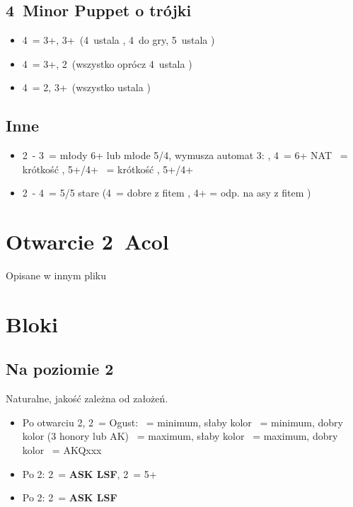 \documentclass[12pt, a4paper]{article}
\newcommand{\lsf}{\color{WildStrawberry}\textbf{ASK LSF}\color{black}}
\begin{document}
\subsection*{4\diams\ Minor Puppet o trójki}
\begin{itemize}
    \item 4\hearts\ = 3+\clubs, 3+\diams\ (4\spades\ ustala \clubs, 4\nt\ do gry, 5\clubs\ ustala \diams)
    \item 4\spades\ = 3+\clubs, 2\diams\ (wszystko oprócz 4\nt\ ustala \clubs)
    \item 4\nt\ = 2\clubs, 3+\diams\ (wszystko ustala \diams)
\end{itemize}


\subsection*{Inne}
\begin{itemize}
    \item 2\nt\ - 3\spades\ = młody 6+ lub młode 5/4, wymusza automat 3\nt:
    \clubs, 4\diams\ = 6+ NAT
    \hearts\ = krótkość \hearts, 5+/4+
    \spades\ = krótkość \spades, 5+/4+
    \item 2\nt\ - 4\clubs\ = 5/5 stare (4\diams\ = dobre z fitem \hearts, 4\nt+ = odp. na asy z fitem \spades)
\end{itemize}



\pagebreak
\section{Otwarcie 2\clubs\ Acol}
Opisane w innym pliku


\pagebreak
\section{Bloki}
\subsection*{Na poziomie 2}
Naturalne, jakość zależna od założeń.
\begin{itemize}
    \item Po otwarciu 2\diams, 2\nt\ = Ogust:
    \clubs\ = minimum, słaby kolor
    \diams\ = minimum, dobry kolor (3 honory lub AK)
    \hearts\ = maximum, słaby kolor
    \spades\ = maximum, dobry kolor
    \nt\ = AKQxxx
    \item Po 2\hearts: 2\spades\ = \lsf, 2\nt\ = 5+\spades\ \fonce
    \item Po 2\spades: 2\nt\ = \lsf
\end{itemize}
\end{document}
